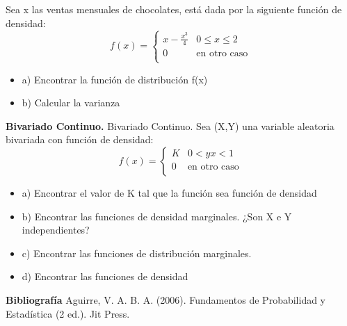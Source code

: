 \documentclass{../oxmathproblems}
\begin{document}
\begin{questions}
\miquestion Sea x las ventas mensuales de chocolates, está dada por la siguiente función de densidad: 
\[ 
f(x) = 
     \begin{cases}
       x- \frac{x^3}{4}  & 0  \leq x  \leq 2 \\
       0 & \text{en otro caso} \\
     \end{cases}
\]
$$$$
\begin{itemize}
\item  a) Encontrar la función de distribución f(x)  
\item  b) Calcular la varianza
\end{itemize}

\miquestion \textbf {Bivariado Continuo. }{Bivariado Continuo. } Sea (X,Y) una variable aleatoria bivariada con función de densidad: 
\[ 
f(x) = 
     \begin{cases}
        K  & 0  < {y}   
        {x} < 1 \\
       0 & \text{en otro caso} \\
     \end{cases}
\]

\begin{itemize}
\item  a) Encontrar el valor de K tal que la función sea función de densidad  
\item  b) Encontrar las funciones de densidad marginales. ¿Son X e Y independientes?
\item  c) Encontrar las funciones de distribución marginales. 
\item  d) Encontrar las funciones de densidad 
\end{itemize}
\end{questions}



\textbf{Bibliografía}
Aguirre, V. A. B. A. (2006). Fundamentos de Probabilidad y Estadística (2 ed.). Jit Press.
\end{document}
